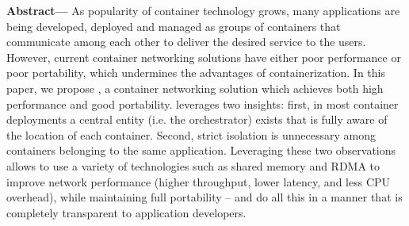 \textbf{Abstract---} 
As popularity of container technology grows, many applications are being
developed, deployed and managed as groups of containers that communicate
among each other to deliver the desired service to the users.  However, current
container networking solutions have either poor performance or poor portability,
which undermines the advantages of containerization.  In this paper, we propose
\sysname, a container networking solution which achieves both high performance
and good portability. \sysname leverages two insights: first, in most container
deployments a central entity (i.e. the orchestrator) exists that is fully aware
of the location of each container. Second, strict isolation is unnecessary
among containers belonging to the same application. Leveraging these two
observations allows \sysname to use a variety of technologies such as shared
memory and RDMA to improve network performance (higher throughput, lower
latency, and less CPU overhead), while maintaining full portability -- and do
all this in a manner that is completely transparent to application developers.

